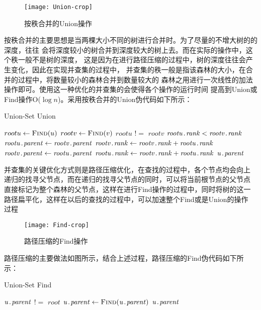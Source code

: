 \begin{figure}[htbp]
\centering\texttt{[image: Union-crop]}
\caption{按秩合并的Union操作}\label{fig:Union}
\end{figure}
按秩合并的主要思想是当两棵大小不同的树进行合并时。为了尽量的不增大树的的深度，往往
会将深度较小的树合并到深度较大的树上去。而在实际的操作中，这个秩一般不是树的深度，
这是因为在进行路径压缩的过程中，树的深度往往会产生变化，因此在实现并查集的过程中，
并查集的秩一般是指该森林的大小，在合并的过程中，将数量较小的森林合并到数量较大的
森林之用进行一次线性的加法操作即可。使用这一种优化的并查集的会使得各个操作的运行时间
提高到Union或Find操作O($\log n$)。采用按秩合并的Union伪代码如下所示：
\begin{algorithm} 
	\caption {Union-Set Union} 
	\begin{codebox}
\li			$rootu \leftarrow \textnormal{\scshape Find}(u)$
\li			$rootv \leftarrow \textnormal{\scshape Find}(v)$
\li			\If	$rootu$ $!=$ $rootv$
\li				\Then
					\If $\attribii{rootu}{rank} < \attribii{rootv}{rank}$
\li						\Then
							$\attribii{rootu}{parent} \leftarrow \attribii{rootv}{parent}$
\li							$\attribii{rootv}{rank} \leftarrow \attribii{rootv}{rank} + \attribii{rootu}{rank}$
\li						\Else
\li							$\attribii{rootv}{parent} \leftarrow \attribii{rootu}{parent}$
\li							$\attribii{rootu}{rank} \leftarrow  \attribii{rootv}{rank} + \attribii{rootu}{rank}$
						\End
				\End
\li			\Return	$\attribii{u}{parent}$
	\end{codebox}
\end{algorithm} 

并查集的关键优化方式则是路径压缩优化，在查找的过程中，各个节点均会向上
递归的找寻父节点，而在递归的找寻父节点的同时，可以将当前根节点的父节点
直接标记为整个森林的父节点，这样在进行Find操作的过程中，同时将树的这一
路径扁平化，这样在以后的查找的过程中，可以加速整个Find或是Union的操作
过程
\begin{figure}[htbp]
\centering\texttt{[image: Find-crop]}
\caption{路径压缩的Find操作}\label{fig:Find}
\end{figure}

路径压缩的主要做法如图所示，结合上述过程，路径压缩的Find伪代码如下所示：
\begin{algorithm} 
	\caption {Union-Set Find} 
	\begin{codebox}
		\Procname{$\proc{Find}(u)$}
\li			\If $\attribii{u}{parent}$ $!=$ $root$
\li			\Then	$\attribii{u}{parent} \leftarrow \proc{Find}(\attribii{u}{parent})$ \End
\li			\Return	$\attribii{u}{parent}$
	\end{codebox}
\end{algorithm} 


